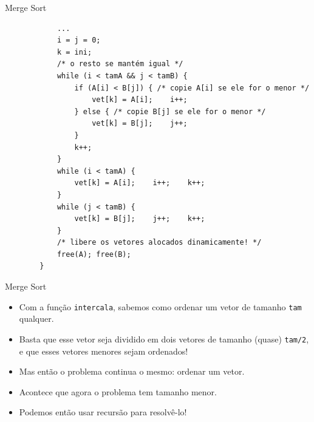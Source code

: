 \documentclass[handout]{beamer}
\newcommand{\cod}[1]{\texttt{#1}}
\begin{document}
\begin{frame}[fragile]{Merge Sort}

    \vspace{-1em}
    \begin{verbatim}
            ...
            i = j = 0;
            k = ini;
            /* o resto se mantém igual */
            while (i < tamA && j < tamB) {
                if (A[i] < B[j]) { /* copie A[i] se ele for o menor */
                    vet[k] = A[i];    i++;
                } else { /* copie B[j] se ele for o menor */
                    vet[k] = B[j];    j++;
                }
                k++;
            }
            while (i < tamA) {
                vet[k] = A[i];    i++;    k++;
            }
            while (j < tamB) {
                vet[k] = B[j];    j++;    k++;
            }
            /* libere os vetores alocados dinamicamente! */
            free(A); free(B);
        }
    \end{verbatim}

\end{frame}

\begin{frame}[fragile]{Merge Sort}

    \begin{itemize}
        \item Com a função \cod{intercala}, sabemos como ordenar um vetor de tamanho \cod{tam} qualquer.
        \item Basta que esse vetor seja dividido em dois vetores de tamanho (quase) \cod{tam/2}, e que esses vetores menores sejam ordenados!
        \item Mas então o problema continua o mesmo: ordenar um vetor.
        \item Acontece que agora o problema tem tamanho menor.
        \item Podemos então usar recursão para resolvê-lo!
    \end{itemize}

\end{frame}
\end{document}

